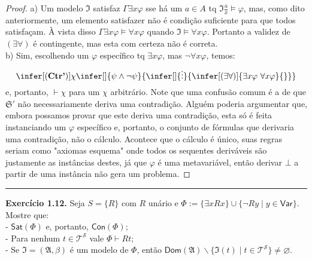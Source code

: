 \documentclass[11pt]{article}
\theoremstyle{definition}
\newcommand{\mc}[1]{\mathcal{#1}}
\newcommand{\mf}[1]{\mathfrak{#1}}
\newcommand{\msf}[1]{\mathsf{#1}}
\begin{document}
\begin{proof}
    a) Um modelo $\mf{I}$ satisfaz $\Gamma\exists x\varphi$ sse há um $a\in A$ tq $\mf{I}\frac{a}{x}\vDash\varphi$, mas, como dito anteriormente, um elemento satisfazer não é condição suficiente para que todos satisfaçam. À vista disso $\Gamma\exists x\varphi\vDash\forall x\varphi$ quando $\mf{I}\vDash\forall x\varphi$. Portanto a validez de $(\exists\forall)$ é contingente, mas esta com certeza não é correta.\\
    b) Sim, escolhendo um $\varphi$ específico tq $\exists x\varphi$, mas $\neg\forall x\varphi$, temos:
    $$\infer[(\textbf{Ctr'})]{\chi}{\infer[]{\psi\wedge\neg\psi}{\infer[]{\vdots}{\infer[(\exists\forall)]{\exists x\varphi~\forall x\varphi}{}}}}$$
    e, portanto, $\vdash\chi$ para um $\chi$ arbitrário. Note que uma confusão comum é a de que $\mf{S}'$ não necessariamente deriva uma contradição. Alguém poderia argumentar que, embora possamos provar que este deriva uma contradição, esta só é feita instanciando um $\varphi$ específico e, portanto, o conjunto de fórmulas que derivaria uma contradição, não o cálculo. Acontece que o cálculo é único, suas regras seriam como "axiomas esquema" onde todos os sequentes deriváveis são justamente as instâncias destes, já que $\varphi$ é uma metavariável, então derivar $\bot$ a partir de uma instância não gera um problema.
\end{proof}

\hrule

\textbf{Exercício 1.12.} Seja $S=\{R\}$ com $R$ unário e $\Phi:=\{\exists xRx\}\cup\{\neg Ry\mid y\in\msf{Var}\}$. Mostre que:\\
- $\msf{Sat}(\Phi)$ e, portanto, $\msf{Con}(\Phi)$;\\
- Para nenhum $t\in\mc{T}^\mc{S}$ vale $\Phi\vdash Rt$;\\
- Se $\mf{I}=(\mf{A},\beta)$ é um modelo de $\Phi$, então $\msf{Dom}(\mf{A})\backslash\{\mf{I}(t)\mid t\in\mc{T}^\mc{S}\}\ne\varnothing$.
\end{document}
